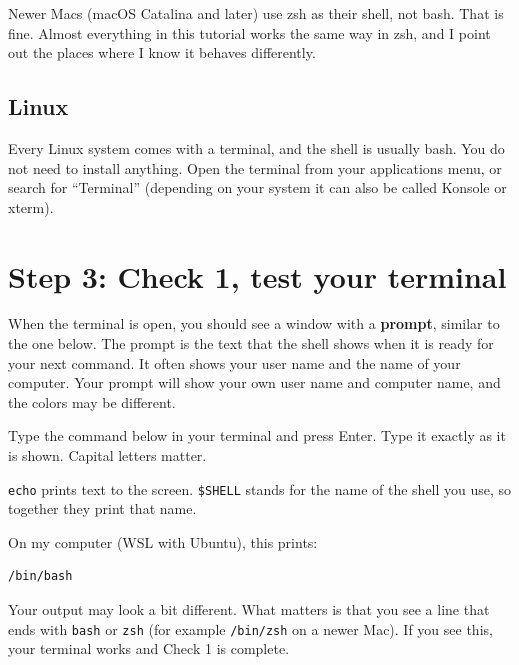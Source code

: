 \documentclass[
  letterpaper,
  DIV=11,
  numbers=noendperiod]{scrreprt}
\newenvironment{Shaded}{}{}
\newcommand{\BuiltInTok}[1]{\textcolor[rgb]{0.84,0.23,0.29}{#1}}
\newcommand{\CommentTok}[1]{\textcolor[rgb]{0.42,0.45,0.49}{#1}}
\newcommand{\VariableTok}[1]{\textcolor[rgb]{0.89,0.38,0.04}{#1}}
\begin{document}
Newer Macs (macOS Catalina and later) use zsh as their shell, not bash.
That is fine. Almost everything in this tutorial works the same way in
zsh, and I point out the places where I know it behaves differently.

\subsection{Linux}\label{linux}

Every Linux system comes with a terminal, and the shell is usually bash.
You do not need to install anything. Open the terminal from your
applications menu, or search for ``Terminal'' (depending on your system
it can also be called Konsole or xterm).

\section{Step 3: Check 1, test your
terminal}\label{step-3-check-1-test-your-terminal}

When the terminal is open, you should see a window with a
\textbf{prompt}, similar to the one below. The prompt is the text that
the shell shows when it is ready for your next command. It often shows
your user name and the name of your computer. Your prompt will show your
own user name and computer name, and the colors may be different.

Type the command below in your terminal and press Enter. Type it exactly
as it is shown. Capital letters matter.

\begin{Shaded}
\end{Shaded}

\texttt{echo} prints text to the screen. \texttt{\$SHELL} stands for the
name of the shell you use, so together they print that name.

On my computer (WSL with Ubuntu), this prints:

\begin{verbatim}
/bin/bash
\end{verbatim}

Your output may look a bit different. What matters is that you see a
line that ends with \texttt{bash} or \texttt{zsh} (for example
\texttt{/bin/zsh} on a newer Mac). If you see this, your terminal works
and Check 1 is complete.
\end{document}
